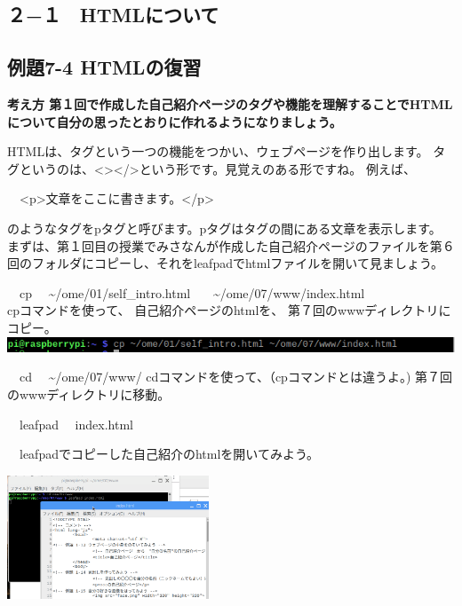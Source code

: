 \documentclass[a4paper,12pt,dvipdfmx]{jarticle}
\begin{document}
\clearpage\subsection*{２−１　HTMLについて}
\subsection*{例題7-4 HTMLの復習}
{\bfseries
考え方\newline
第１回で作成した自己紹介ページのタグや機能を理解することでHTMLについて自分の思ったとおりに作れるようになりましょう。}


\bigskip

HTMLは、タグという一つの機能をつかい、ウェブページを作り出します。\newline
タグというのは、{\textless}{\textgreater}{\textless}/{\textgreater}という形です。見覚えのある形ですね。\newline
例えば、

\ \ {\textless}p{\textgreater}文章をここに書きます。{\textless}/p{\textgreater}

のようなタグをpタグと呼びます。pタグはタグの間にある文章を表示します。\newline
まずは、第１回目の授業でみさなんが作成した自己紹介ページのファイルを第６回のフォルダにコピーし、それをleafpadでhtmlファイルを開いて見ましょう。

		\begin{minipage}[b]{0.5\textwidth}
\begin{enumerate}


		\begin{minipage}[b]{1.5\textwidth}
\item \ \ cp \ \ \~{}/ome/01/self\_intro.html \ \ \ \~{}/ome/07/www/index.html\\
cpコマンドを使って、 自己紹介ページのhtmlを、 第７回のwwwディレクトリにコピー。\\
\includegraphics[width=14.73cm]{ome7-img033.png}
		\end{minipage}

\bigskip

\item
\ \ cd \ \ \~{}/ome/07/www/\newline
cdコマンドを使って、（cpコマンドとは違うよ。) 第７回のwwwディレクトリに移動。


\item \ \ leafpad \ \ index.html

\ \ leafpadでコピーした自己紹介のhtmlを開いてみよう。

\end{enumerate}
		\end{minipage}
\includegraphics[width=0.45\textwidth]{ome7-img034.png}
\end{document}
